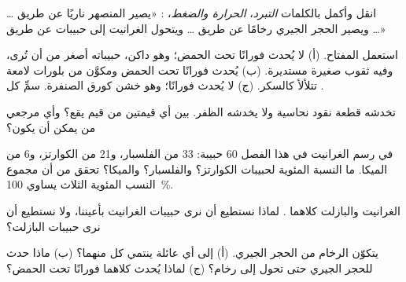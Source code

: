 \begin{exercise}[$\star$]\label{exo:g6:rocks-and-minerals:4}
انقل وأكمل بالكلمات \emph{التبرد}، \emph{الحرارة والضغط}،
\emph{}: «يصير  المنصهر  ناريًا عن طريق \ldots{} ويصير
الحجر الجيري رخامًا عن طريق \ldots{} ويتحول الغرانيت إلى حبيبات 
عن طريق \ldots»
\end{exercise}

\begin{exercise}[$\star\star$]\label{exo:g6:rocks-and-minerals:5}
استعمل المفتاح. (أ)  لا يُحدث فورانًا تحت الحمض؛ وهو داكن، حبيباته
أصغر من أن تُرى، وفيه ثقوب صغيرة مستديرة. (ب)  يُحدث فورانًا تحت الحمض
ومكوَّن من بلورات لامعة تتلألأ كالسكر. (ج)  لا يُحدث فورانًا؛ وهو خشن
كورق الصنفرة. سمِّ كل .
\end{exercise}

\begin{exercise}[$\star\star$]\label{exo:g6:rocks-and-minerals:6}
 تخدشه قطعة نقود نحاسية ولا يخدشه الظفر. بين أي قيمتين من قيم
 يقع؟ وأي  مرجعي من  
يمكن أن يكون؟
\end{exercise}

\begin{exercise}[$\star\star$]\label{exo:g6:rocks-and-minerals:7}
في رسم الغرانيت في هذا الفصل 60 حبيبة: 33 من الفلسبار، و21 من
الكوارتز، و6 من الميكا. ما النسبة المئوية لحبيبات الكوارتز؟ والفلسبار؟
والميكا؟ تحقق من أن مجموع النسب المئوية الثلاث يساوي
100~\%.
\end{exercise}

\begin{exercise}[$\star\star$]\label{exo:g6:rocks-and-minerals:8}
الغرانيت والبازلت كلاهما . لماذا نستطيع أن نرى حبيبات الغرانيت
بأعيننا، ولا نستطيع أن نرى حبيبات البازلت؟
\end{exercise}

\begin{exercise}[$\star\star$]\label{exo:g6:rocks-and-minerals:9}
يتكوّن الرخام من الحجر الجيري. (أ) إلى أي عائلة ينتمي كل منهما؟
(ب) ماذا حدث للحجر الجيري حتى تحول إلى رخام؟ (ج) لماذا يُحدث كلاهما
فورانًا تحت الحمض؟
\end{exercise}

